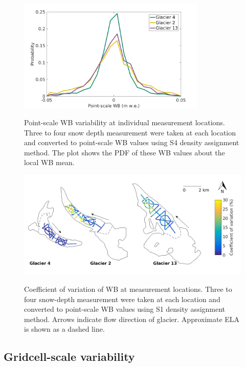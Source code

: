 \documentclass{sfuthesis}
\begin{document}
\begin{figure}[H]
	\centering
	\includegraphics[width =0.8\textwidth]{SWEvarOneLocHIST.png}\\
	\caption[Point-scale WB variability at individual measurement locations]{Point-scale WB variability at individual measurement locations. Three to four snow depth measurement were taken at each location and converted to point-scale WB values using S4 density assignment method. The plot shows the PDF of these WB values about the local WB mean.}
	\label{fig:SWEvar_oneloc_hist}
\end{figure}

\begin{figure}[H]
	\centering
	\includegraphics[width =\textwidth]{Map_pointstd.png}\\
	\caption[Coefficient of variation of WB at measurement locations]{Coefficient of variation of WB at measurement locations. Three to four snow-depth measurement were taken at each location and converted to point-scale WB values using S1 density assignment method. Arrows indicate flow direction of glacier. Approximate ELA is shown as a dashed line.}
	\label{fig:SWEvar_oneloc_map}
\end{figure}

\subsection{Gridcell-scale variability}
\end{document}
